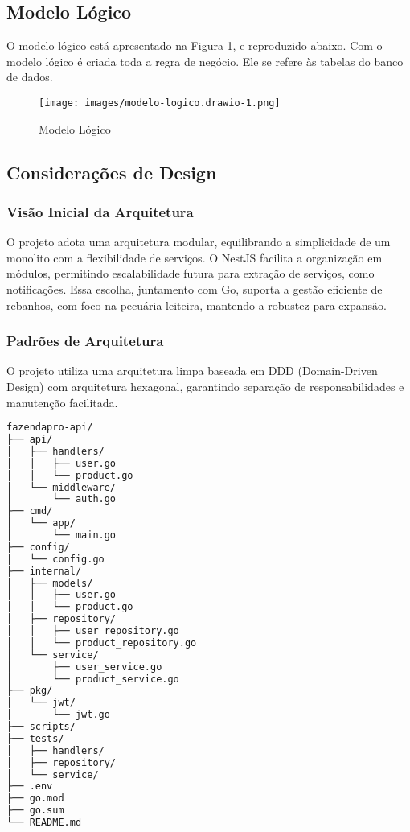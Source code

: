\documentclass[12pt, a4paper]{article}
\begin{document}
\subsection{Modelo Lógico}
\begin{spacing}{1.5}
O modelo lógico está apresentado na Figura \ref{fig:entity-relationship}, e reproduzido abaixo. Com o modelo lógico é criada toda a regra de negócio. Ele se refere às tabelas do banco de dados.
\begin{figure}[H]
\centering
\texttt{[image: images/modelo-logico.drawio-1.png]}
\caption{Modelo Lógico}
\label{fig:entity-relationship}
\end{figure}
\end{spacing}

\subsection{Considerações de Design}
\subsubsection{Visão Inicial da Arquitetura}
\begin{spacing}{1.5}
O projeto adota uma arquitetura modular, equilibrando a simplicidade de um monolito com a flexibilidade de serviços. O NestJS facilita a organização em módulos, permitindo escalabilidade futura para extração de serviços, como notificações. Essa escolha, juntamento com Go, suporta a gestão eficiente de rebanhos, com foco na pecuária leiteira, mantendo a robustez para expansão.
\end{spacing}

\subsubsection{Padrões de Arquitetura}
\begin{spacing}{1.5}
O projeto utiliza uma arquitetura limpa baseada em DDD (Domain-Driven Design) com arquitetura hexagonal, garantindo separação de responsabilidades e manutenção facilitada.
\end{spacing}

\begin{lstlisting}[language=bash, caption={Estrutura de Diretórios do Projeto}]
fazendapro-api/
├── api/
│   ├── handlers/
│   │   ├── user.go
│   │   └── product.go
│   └── middleware/
│       └── auth.go
├── cmd/
│   └── app/
│       └── main.go
├── config/
│   └── config.go
├── internal/
│   ├── models/
│   │   ├── user.go
│   │   └── product.go
│   ├── repository/
│   │   ├── user_repository.go
│   │   └── product_repository.go
│   └── service/
│       ├── user_service.go
│       └── product_service.go
├── pkg/
│   └── jwt/
│       └── jwt.go
├── scripts/
├── tests/
│   ├── handlers/
│   ├── repository/
│   └── service/
├── .env
├── go.mod
├── go.sum
└── README.md
\end{lstlisting}
\end{document}
